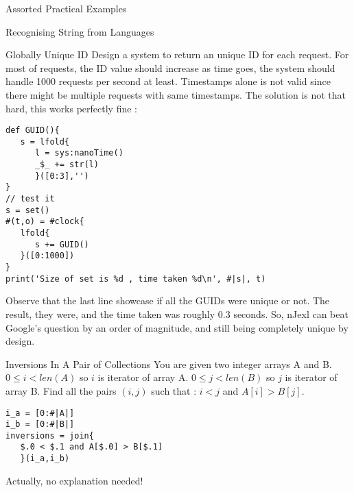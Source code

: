 \begin{section}{Assorted Practical Examples}
\begin{subsection}{Recognising String from Languages}

\end{subsection}

\begin{subsection}{Globally Unique ID}
Design a system to return an unique ID for each request. 
For most of requests, the ID value should increase as time goes, 
the system should handle 1000 requests per second at least. 
Timestamps alone is not valid since there might be multiple requests with same timestamps.
The solution is not that hard, this works perfectly fine :

\begin{center}\begin{minipage}{\linewidth}
\begin{lstlisting}[style=JexlStyle]
def GUID(){
   s = lfold{
      l = sys:nanoTime()
      _$_ += str(l)
      }([0:3],'')
}
// test it 
s = set()
#(t,o) = #clock{
   lfold{
      s += GUID()
   }([0:1000])
}
print('Size of set is %d , time taken %d\n', #|s|, t)
\end{lstlisting}  
\end{minipage}\end{center}

Observe that the last line showcase if all the GUIDs were unique or not.
The result, they were, and the time taken was roughly $0.3$ seconds.
So, nJexl can beat Google's question by an order of magnitude, and still 
being completely unique by design.
\end{subsection}

\begin{subsection}{Inversions In A Pair of Collections}
You are given two integer arrays A and B. 
$0 \le i < len(A)$ so $i$ is iterator of array A.
$0 \le j < len(B)$ so $j$ is iterator of array B.
Find all the pairs $(i,j)$ such that : $i < j$ and $A[i] > B[j]$.

\begin{center}\begin{minipage}{\linewidth}
\begin{lstlisting}[style=JexlStyle]
i_a = [0:#|A|]
i_b = [0:#|B|]
inversions = join{
   $.0 < $.1 and A[$.0] > B[$.1]
   }(i_a,i_b)
\end{lstlisting}  
\end{minipage}\end{center}
Actually, no explanation needed!
\end{subsection}


\end{section}
